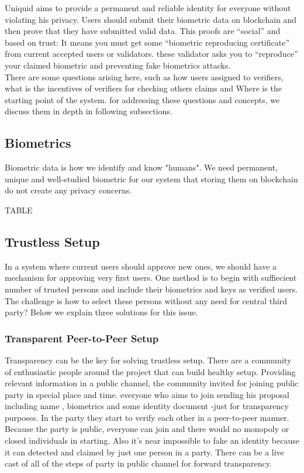 \documentclass{article}
\begin{document}
  Uniquid aims to provide a permanent and reliable identity for everyone without violating his privacy.  Users should submit their biometric data on blockchain and then prove that they have submitted valid data. This proofs are “social” and based on trust: It means you must get some “biometric reproducing certificate” from current accepted users or validators. these validator asks you to “reproduce” your claimed biometric and preventing fake biometrics attacks.
  \\
  There are some questions arising here, such as how users assigned to verifiers, what is the incentives of verifiers for checking others claims and Where is the starting point of the system. for addressing these questions and concepts, we discuss them in depth in following subsections.
\subsection{Biometrics}
Biometric data is how we identify and know "humans". We need permanent, unique and well-studied biometric for our system that storing them on blockchain do not create any privacy concerns. 

TABLE


\subsection{Trustless Setup}
In a system where current users should approve new ones, we should have a mechanism for approving very first users. One method is to begin with suffiecient number of trusted persons and include their biometrics and keys as verified users. The challenge is how to select these persons without any need for central third party? Below we explain three solutions for this issue.

\subsubsection*{Transparent Peer-to-Peer Setup} 
Transparency can be the key for solving trustless setup. There are a community of enthusiastic people around the project that can build healthy setup. Providing relevant information in a public channel, the community invited for joining public party in special place and time. everyone who aims to join sending his proposal including name , biometrics and some identity document -just for transparency purposes. In the party they start to verify each other in a peer-to-peer manner. Because the party is public, everyone can join and there would no monopoly or closed individuals in starting. Also it's near impossible to fake an identity because it can detected and claimed by just one person in a party. There can be a live cast of all of the steps of party in public channel for forward transparency.
\end{document}
